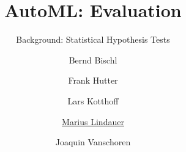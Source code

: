 


\usepackage{multirow}


\title[AutoML: Risks]{AutoML: Evaluation} %
\subtitle{Background: Statistical Hypothesis Tests} %
\author[Marius Lindauer]{Bernd Bischl \and Frank Hutter \and Lars Kotthoff\newline \and \underline{Marius Lindauer} \and Joaquin Vanschoren}
\institute{}
\date{}

\newcommand\reffootnote[1]{%
	\begingroup
	\renewcommand\thefootnote{}\footnote{
		\tiny #1
		\vspace*{1em}}%
	\addtocounter{footnote}{-1}%
	\endgroup
}



	
	\maketitle
	
